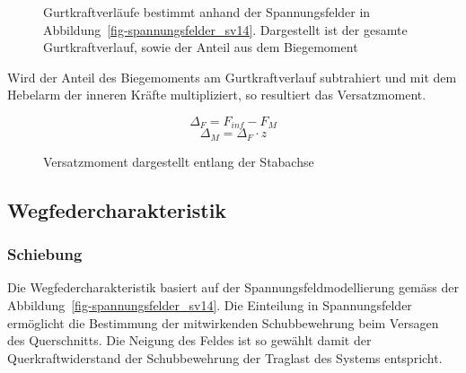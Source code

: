 \documentclass[
  11pt,
  letterpaper,
]{scrreprt}
\begin{document}
\begin{figure}[H]


\caption{\label{fig-gurtkraft_sv14}Gurtkraftverläufe bestimmt anhand der
Spannungsfelder in Abbildung~\ref{fig-spannungsfelder_sv14}. Dargestellt
ist der gesamte Gurtkraftverlauf, sowie der Anteil aus dem Biegemoment}

\end{figure}%

Wird der Anteil des Biegemoments am Gurtkraftverlauf subtrahiert und mit
dem Hebelarm der inneren Kräfte multipliziert, so resultiert das
Versatzmoment.

\[
\Delta_F = F_{inf} - F_M
\] \[
\Delta_M = \Delta_F \cdot z
\]

\begin{figure}[H]


\caption{\label{fig-versatzmoment_sv14}Versatzmoment dargestellt entlang
der Stabachse}

\end{figure}%

\subsection{Wegfedercharakteristik}\label{wegfedercharakteristik-1}

\subsubsection{Schiebung}\label{schiebung-1}

Die Wegfedercharakteristik basiert auf der Spannungsfeldmodellierung
gemäss der Abbildung~\ref{fig-spannungsfelder_sv14}. Die Einteilung in
Spannungsfelder ermöglicht die Bestimmung der mitwirkenden
Schubbewehrung beim Versagen des Querschnitts. Die Neigung des Feldes
ist so gewählt damit der Querkraftwiderstand der Schubbewehrung der
Traglast des Systems entspricht.
\end{document}
